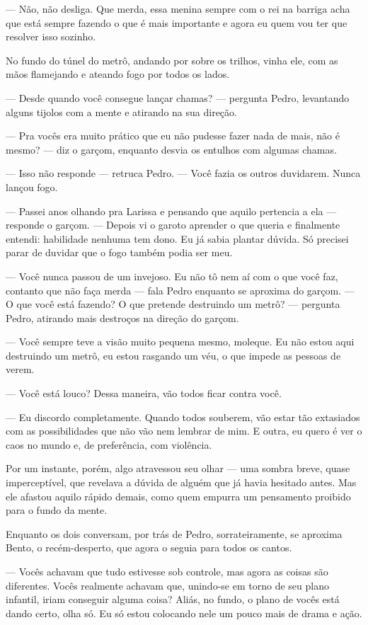— Não, não desliga. Que merda, essa menina sempre com o rei na barriga acha que está sempre fazendo o que é mais importante e agora eu quem vou ter que resolver isso sozinho.

No fundo do túnel do metrô, andando por sobre os trilhos, vinha ele, com as mãos flamejando e ateando fogo por todos os lados.

— Desde quando você consegue lançar chamas? — pergunta Pedro, levantando alguns tijolos com a mente e atirando na sua direção.

— Pra vocês era muito prático que eu não pudesse fazer nada de mais, não é mesmo? — diz o garçom, enquanto desvia os entulhos com algumas chamas.

— Isso não responde — retruca Pedro. — Você fazia os outros duvidarem. Nunca lançou fogo.

— Passei anos olhando pra Larissa e pensando que aquilo pertencia a ela — responde o garçom. — Depois vi o garoto aprender o que queria e finalmente entendi: habilidade nenhuma tem dono. Eu já sabia plantar dúvida. Só precisei parar de duvidar que o fogo também podia ser meu.

— Você nunca passou de um invejoso. Eu não tô nem aí com o que você faz, contanto que não faça merda — fala Pedro enquanto se aproxima do garçom. — O que você está fazendo? O que pretende destruindo um metrô? — pergunta Pedro, atirando mais destroços na direção do garçom.

— Você sempre teve a visão muito pequena mesmo, moleque. Eu não estou aqui destruindo um metrô, eu estou rasgando um véu, o que impede as pessoas de verem.

— Você está louco? Dessa maneira, vão todos ficar contra você.

— Eu discordo completamente. Quando todos souberem, vão estar tão extasiados com as possibilidades que não vão nem lembrar de mim. E outra, eu quero é ver o caos no mundo e, de preferência, com violência.

Por um instante, porém, algo atravessou seu olhar — uma sombra breve, quase imperceptível, que revelava a dúvida de alguém que já havia hesitado antes. Mas ele afastou aquilo rápido demais, como quem empurra um pensamento proibido para o fundo da mente.

Enquanto os dois conversam, por trás de Pedro, sorrateiramente, se aproxima Bento, o recém-desperto, que agora o seguia para todos os cantos.

— Vocês achavam que tudo estivesse sob controle, mas agora as coisas são diferentes. Vocês realmente achavam que, unindo-se em torno de seu plano infantil, iriam conseguir alguma coisa? Aliás, no fundo, o plano de vocês está dando certo, olha só. Eu só estou colocando nele um pouco mais de drama e ação.

